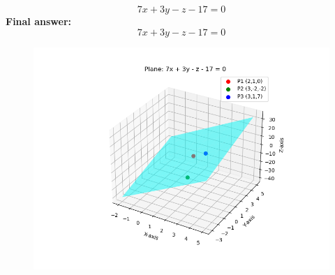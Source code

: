 \documentclass[journal]{IEEEtran}
\begin{document}
\begin{equation}
7x + 3y - z - 17 = 0
\end{equation}
\textbf{Final answer:}
\[
\boxed{7x + 3y - z - 17 = 0}
\]


\begin{figure}[H]
\begin{center}
\includegraphics[width=0.6\columnwidth]{figs/fig6.png}
\end{center}
\caption{}
\label{fig:Fig}
\end{figure}
\end{document}
